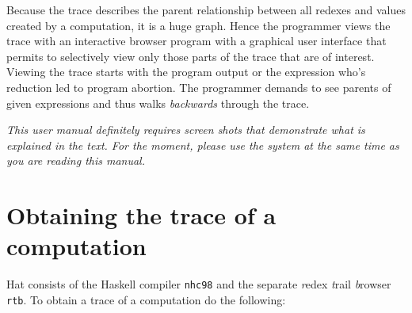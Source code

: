 \documentclass[12pt]{article}
\begin{document}
Because the trace describes the parent relationship between all redexes and values created by a computation, it is a huge graph. Hence the programmer views the trace with an interactive browser program with a graphical user interface that permits to selectively view only those parts of the trace that are of interest.
Viewing the trace starts with the program output or the expression who's reduction led to program abortion. The programmer demands to see parents of given expressions and thus walks \emph{backwards} through the trace.

\emph{This user manual definitely requires screen shots that demonstrate what is explained in the text. For the moment, please use the system at the same time as you are reading this manual.}


\section{Obtaining the trace of a computation}

Hat consists of the Haskell compiler \texttt{nhc98} and the separate \emph{r}edex \emph{t}rail \emph{b}rowser \texttt{rtb}. To obtain a trace of a computation do the following:
\end{document}
